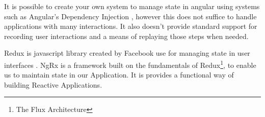 It is possible to create your own system to manage state in angular using systems such as Angular's Dependency Injection \cite{wiki:DependencyInjection}, however this does not suffice to handle applications with many interactions. It also doesn't provide standard support for recording user interactions and a means of replaying those steps when needed.

Redux is javascript library created by Facebook use for managing state in user interfaces \cite{wiki:Redux}. NgRx \cite{cheng2018state} is a framework built on the fundamentals of Redux\footnote{The Flux Architecture}, to enable us to maintain state in our Application. It is provides a functional way of building Reactive Applications.

